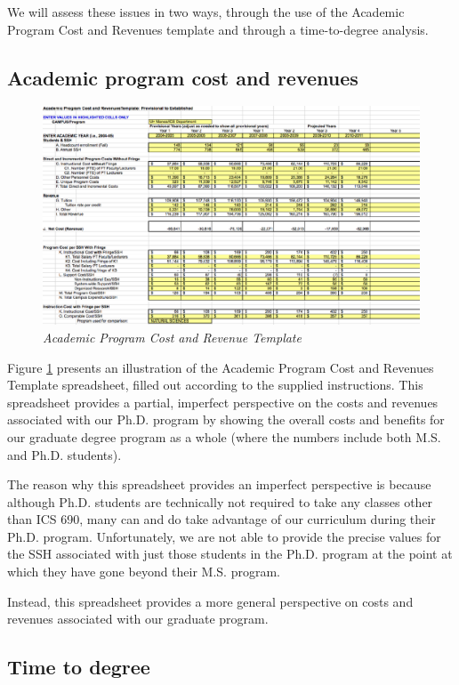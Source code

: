 \documentclass[12pt]{article}
\begin{document}
We will assess these issues in two ways, through the use of the Academic
Program Cost and Revenues template and through a time-to-degree analysis.

\subsection{Academic program cost and revenues}

\begin{figure}[ht]
  \center
  \includegraphics{costs.eps}
  \caption{\em \small Academic Program Cost and Revenue Template}
  \label{fig:costs}
\end{figure} 

Figure \ref{fig:costs} presents an illustration of the Academic Program
Cost and Revenues Template spreadsheet, filled out according to the
supplied instructions.  This spreadsheet provides a partial, imperfect
perspective on the costs and revenues associated with our Ph.D. program by
showing the overall costs and benefits for our graduate degree program as a
whole (where the numbers include both M.S. and Ph.D. students).

The reason why this spreadsheet provides an imperfect perspective is
because although Ph.D. students are technically not required to take any
classes other than ICS 690, many can and do take advantage of our
curriculum during their Ph.D. program.  Unfortunately, we are not able to
provide the precise values for the SSH associated with just those students
in the Ph.D. program at the point at which they have gone beyond their
M.S. program. 

Instead, this spreadsheet provides a more general perspective on costs and
revenues associated with our graduate program. 

\subsection{Time to degree}
\end{document}
